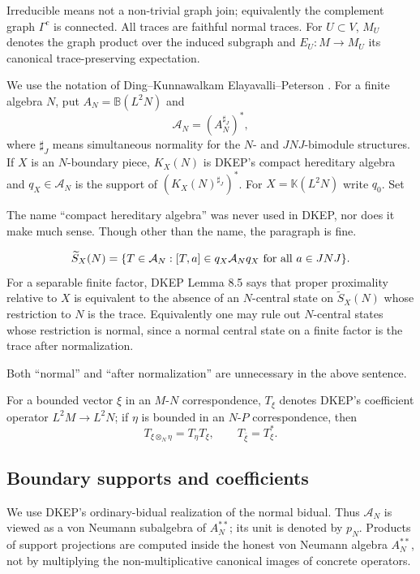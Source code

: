 \documentclass[12pt]{article}
\newcommand{\cA}{\mathcal A}
\newcommand{\review}[1]{\begin{reviewbox}#1\end{reviewbox}}
\begin{document}
Irreducible means not a non-trivial graph join; equivalently the complement
graph \(\Gamma^c\) is connected.  All traces are faithful normal traces.  For
\(U\subset V\), \(M_U\) denotes the graph product over the induced subgraph and
\(E_U:M\to M_U\) its canonical trace-preserving expectation.

We use the notation of Ding--Kunnawalkam Elayavalli--Peterson \cite{DKEP}.
For a finite algebra \(N\), put \(A_N=\mathbb B(L^2N)\) and
\[
        \cA_N=(A_N^{\sharp_J})^*,
\]
where \(\sharp_J\) means simultaneous normality for the \(N\)- and
\(JNJ\)-bimodule structures.  If \(X\) is an \(N\)-boundary piece, \(K_X(N)\)
is DKEP's compact hereditary algebra and \(q_X\in\cA_N\) is the support of
\((K_X(N)^{\sharp_J})^*\).  For \(X=\mathbb K(L^2N)\) write \(q_0\).  Set

\review{The name ``compact hereditary algebra'' was never used in DKEP, nor does it make much sense. Though other than the name, the paragraph is fine.}

\[
 \widetilde S_X(N)=\{T\in\cA_N:[T,a]\in q_X\cA_Nq_X\hbox{ for all }
 a\in JNJ\}.
\]
For a separable finite factor, DKEP Lemma 8.5 says that proper proximality
relative to \(X\) is equivalent to the absence of an \(N\)-central state on
\(\widetilde S_X(N)\) whose restriction to \(N\) is the trace.  Equivalently
one may rule out \(N\)-central states whose restriction is normal, since a
normal central state on a finite factor is the trace after normalization.

\review{Both ``normal'' and ``after normalization'' are unnecessary in the above sentence.}

For a bounded vector \(\xi\) in an \(M\)-\(N\) correspondence, \(T_\xi\) denotes
DKEP's coefficient operator \(L^2M\to L^2N\); if \(\eta\) is bounded in an
\(N\)-\(P\) correspondence, then
\[
        T_{\xi\otimes_N\eta}=T_\eta T_\xi,\qquad
        T_{\bar\xi}=T_\xi^* .                                    \tag{1}
\]

\subsection*{Boundary supports and coefficients}

We use DKEP's ordinary-bidual realization of the normal bidual.  Thus
\(\cA_N\) is viewed as a von Neumann subalgebra of \(A_N^{**}\); its unit is
denoted by \(p_N\).  Products of support projections are computed inside the
honest von Neumann algebra \(A_N^{**}\), not by multiplying the
non-multiplicative canonical images of concrete operators.
\end{document}
